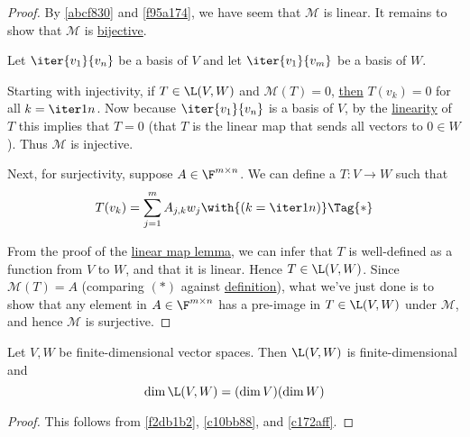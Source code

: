 \begin{proof}
  By \autoref{abcf830} and \autoref{f95a174}, we have seem that $\mathcal M$ is
  linear. It remains to show that $\mathcal M$ is \href{d205f32}{bijective}.

  Let $\iter{v_1}{v_n}$ be a basis of $V$ and let $\iter{v_1}{v_m}$ be a basis
  of $W$.

  Starting with injectivity, if $T\in\L(V,W)$ and $\mathcal M(T)=0$,
  \href{c70dad0}{then} $T(v_k)=0$ for all $k=\iter1n$. Now because
  $\iter{v_1}{v_n}$ is a basis of $V$, by the \href{d7d1925}{linearity} of $T$
  this implies that $T=0$ (that $T$ is the linear map that sends all vectors to
  $0\in W$). Thus $\mathcal M$ is injective.

  Next, for surjectivity, suppose $A\in\F^{m\times n}$. We can define a $T:V\to
  W$ such that
  \begin{equation*}
    T(v_k)=\sum_{j=1}^m A_{j,k}w_j\with{(k=\iter1n)}\Tag{*}
  \end{equation*}

  From the proof of the \href{f1c27fd}{linear map lemma}, we can infer that $T$
  is well-defined as a function from $V$ to $W$, and that it is linear. Hence
  $T\in\L(V,W)$. Since $\mathcal M(T)=A$ (comparing $(*)$ against
  \href{c70dad0}{definition}), what we've just done is to show that any element
  in $A\in\F^{m\times n}$ has a pre-image in $T\in\L(V,W)$ under $\mathcal M$,
  and hence $\mathcal M$ is surjective.
\end{proof}

\label{eb3bad0}

Let $V,W$ be finite-dimensional vector spaces. Then $\L(V,W)$ is
finite-dimensional and
$$
  \dim\L(V,W)=(\dim V)(\dim W)
$$

\begin{proof}
  This follows from \autoref{f2db1b2}, \autoref{c10bb88}, and \autoref{c172aff}.
\end{proof}
